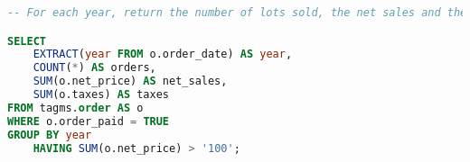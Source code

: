 \begin{lstlisting}[language=SQL,
keywordstyle=\color{blue},
stringstyle=\color{mauve},
showstringspaces=false,
breaklines=true,
basicstyle=\ttfamily\footnotesize]
-- For each year, return the number of lots sold, the net sales and the added taxes paid by the customers

SELECT
    EXTRACT(year FROM o.order_date) AS year,
    COUNT(*) AS orders,
    SUM(o.net_price) AS net_sales,
    SUM(o.taxes) AS taxes
FROM tagms.order AS o
WHERE o.order_paid = TRUE
GROUP BY year
    HAVING SUM(o.net_price) > '100';



\end{lstlisting}

